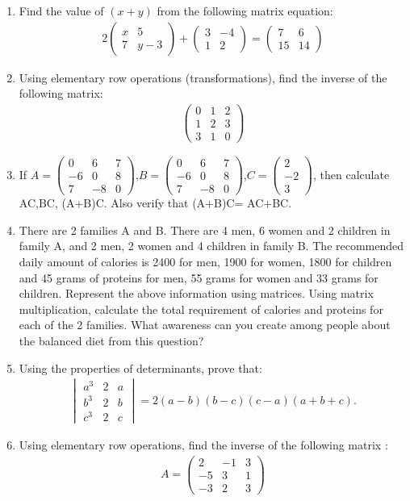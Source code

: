 \documentclass[12pt,-letter paper]{article}
\newcommand{\myvec}[1]{\ensuremath{\begin{pmatrix}#1\end{pmatrix}}}
\newcommand{\mydet}[1]{\ensuremath{\begin{vmatrix}#1\end{vmatrix}}}
\begin{document}
\begin{enumerate}
	\item Find the value of $(x+y)$ from the following matrix equation:
    \begin{align*}
        2 \myvec{x&5\\7&y-3}+\myvec{3&-4\\1&2} = \myvec{7&6\\15&14}
    \end{align*}

	\item Using elementary row operations (transformations), find the inverse of the following matrix:
    \begin{align*}
        \myvec{0&1&2\\1&2&3\\3&1&0}
    \end{align*}
    \item If $A = \myvec{0&6&7\\-6&0&8\\7&-8&0}$,$B =\myvec{0&6&7\\-6&0&8\\7&-8&0}$,$C = \myvec{2\\-2\\3}$, then calculate AC,BC, (A+B)C. Also verify that (A+B)C= AC+BC.

	\item There are 2 families A and B. There are 4 men, 6 women and 2 children in family A, and 2 men, 2 women and 4 children in family B. The recommended daily amount of calories is 2400 for men, 1900 for women, 1800 for children and 45 grams of proteins for men, 55 grams for women and 33 grams for children. Represent the above information using matrices. Using matrix multiplication, calculate the total requirement of calories and proteins for each of the 2 families. What awareness can you create among people about the balanced diet from this question?

	\item Using the properties of determinants, prove that:
	\begin{align*}
		\mydet{a^3 & 2 & a \\
		b^3 & 2 & b\\
		c^3 & 2 & c} = 2(a - b) (b-c) (c-a) (a+b+c).
	\end{align*}
	
	\item Using elementary row operations, find the inverse of the following matrix :
	\begin{align*}
		A = \myvec{2 & -1 & 3\\
		-5 & 3 & 1 \\
		-3 & 2 & 3}
	\end{align*}




\end{enumerate}
\end{document}
